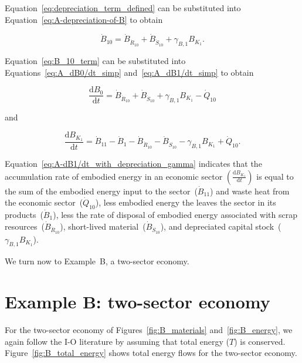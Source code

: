 Equation~\ref{eq:depreciation_term_defined} can be substituted into
Equation~\ref{eq:A-depreciation-of-B} to obtain

\begin{equation} \label{eq:B_10_term}
	\dot{B}_{10}
	= \dot{B}_{\dot{R}_{10}}
	+ \dot{B}_{\dot{S}_{10}}
	+ \gamma_{B,1} B_{K_{1}}.	
\end{equation}

\noindent{}Equation~\ref{eq:B_10_term} 
can be substituted into Equations~\ref{eq:A_dB0/dt_simp}
and~\ref{eq:A_dB1/dt_simp} to obtain 

\begin{equation} \label{eq:A-dB0/dt_with_depreciation_gamma}
	\frac{\mathrm{d}B_{0}}{\mathrm{d}t} 
	= \dot{B}_{\dot{R}_{10}}
	+ \dot{B}_{\dot{S}_{10}}
	+ \gamma_{B,1} B_{K_{1}}
	- \dot{Q}_{10} 
\end{equation}

\noindent{}and

\begin{equation} \label{eq:A-dB1/dt_with_depreciation_gamma}
	\frac{\mathrm{d}B_{K_{1}}}{\mathrm{d}t} 
	= \dot{B}_{11}
	- \dot{B}_{1}
	- \dot{B}_{\dot{R}_{10}}
	- \dot{B}_{\dot{S}_{10}}
	- \gamma_{B,1} B_{K_{1}}
	+ \dot{Q}_{10}.
\end{equation}

\noindent{}Equation~\ref{eq:A-dB1/dt_with_depreciation_gamma} 
indicates that the accumulation rate 
of embodied energy in an economic sector 
$\left( \frac{\mathrm{d}B_{K_{1}}}{\mathrm{d}t} \right)$
is equal to the sum of the embodied energy input to the sector~($\dot{B}_{11}$)
and waste heat from the economic sector~($\dot{Q}_{10}$),
less embodied energy the leaves the sector in its products~($\dot{B}_{1}$), 
less the rate of disposal of embodied energy associated with 
scrap resources~($\dot{B}_{\dot{R}_{10}}$),
short-lived material~($\dot{B}_{\dot{S}_{10}}$), and
depreciated capital stock~($\gamma_{B,1} B_{K_{1}}$).

We turn now to Example~B, a two-sector economy.


\section{Example B: two-sector economy} %
\label{sec:Embodied_Energy_Example_B}

For the two-sector economy of Figures~\ref{fig:B_materials}
and~\ref{fig:B_energy}, we again follow the I-O literature 
by assuming that total energy ($T$) is conserved. 
Figure~\ref{fig:B_total_energy} shows total energy
flows for the two-sector economy.

